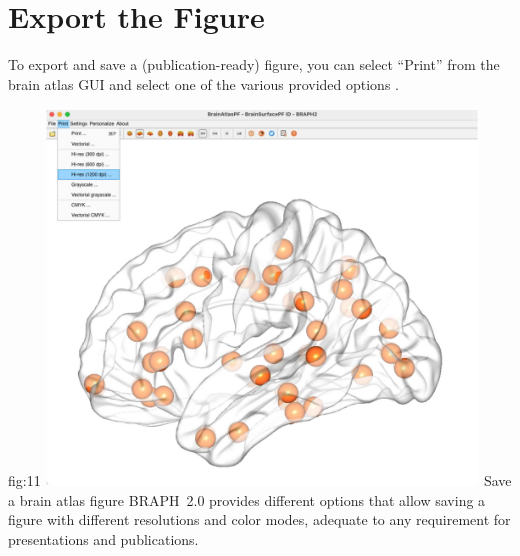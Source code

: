 \documentclass[justified]{tufte-handout}
\begin{document}
\clearpage
\section{Export the Figure}

To export and save a (publication-ready) figure, you can select ``Print'' from the brain atlas GUI and select one of the various provided options .

	{fig:11}
	{\includegraphics[height=10cm]{fig11.jpg}}
	{Save a brain atlas figure}
	{
	BRAPH~2.0 provides different options that allow saving a figure with different resolutions and color modes, adequate to any requirement for presentations and publications.
	}
\end{document}
